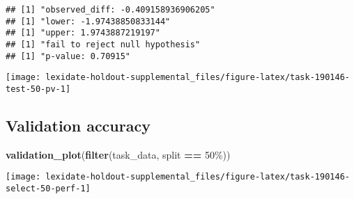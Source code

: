 \documentclass[
]{book}
\newenvironment{Shaded}{\begin{snugshade}}{\end{snugshade}}
\newcommand{\AttributeTok}[1]{\textcolor[rgb]{0.13,0.29,0.53}{#1}}
\newcommand{\DecValTok}[1]{\textcolor[rgb]{0.00,0.00,0.81}{#1}}
\newcommand{\FunctionTok}[1]{\textcolor[rgb]{0.13,0.29,0.53}{\textbf{#1}}}
\newcommand{\NormalTok}[1]{#1}
\newcommand{\OtherTok}[1]{\textcolor[rgb]{0.56,0.35,0.01}{#1}}
\newcommand{\SpecialCharTok}[1]{\textcolor[rgb]{0.81,0.36,0.00}{\textbf{#1}}}
\newcommand{\StringTok}[1]{\textcolor[rgb]{0.31,0.60,0.02}{#1}}
\begin{document}
\begin{Shaded}
\end{Shaded}

\begin{verbatim}
## [1] "observed_diff: -0.409158936906205"
## [1] "lower: -1.97438850833144"
## [1] "upper: 1.9743887219197"
## [1] "fail to reject null hypothesis"
## [1] "p-value: 0.70915"
\end{verbatim}

\texttt{[image: lexidate-holdout-supplemental\_files/figure-latex/task-190146-test-50-pv-1]}

\hypertarget{validation-accuracy-17}{%
\subsection{Validation accuracy}\label{validation-accuracy-17}}

\begin{Shaded}
\begin{Highlighting}[]
\FunctionTok{validation\_plot}\NormalTok{(}\FunctionTok{filter}\NormalTok{(task\_data, split }\SpecialCharTok{==} \StringTok{\textquotesingle{}50\%\textquotesingle{}}\NormalTok{))}
\end{Highlighting}
\end{Shaded}

\texttt{[image: lexidate-holdout-supplemental\_files/figure-latex/task-190146-select-50-perf-1]}
\end{document}
